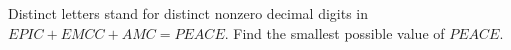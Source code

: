 Distinct letters stand for distinct nonzero decimal digits in $EPIC+EMCC+AMC=PEACE$. Find the smallest possible value of $PEACE$.
